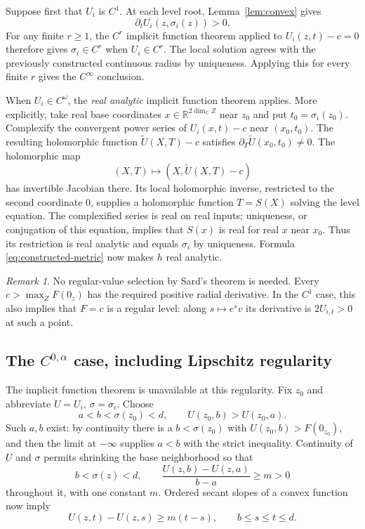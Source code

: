 \documentclass[11pt]{amsart}
\theoremstyle{definition}
\theoremstyle{remark}
\newtheorem{remark}[theorem]{Remark}
\numberwithin{equation}{section}
\newcommand{\C}{\mathbb C}
\newcommand{\R}{\mathbb R}
\begin{document}
Suppose first that $U_i$ is $C^1$. At each level root,
Lemma~\ref{lem:convex} gives
\begin{equation}\label{eq:transversality}
\partial_tU_i(z,\sigma_i(z))>0.
\end{equation}
For any finite $r\ge1$, the $C^r$ implicit function theorem applied
to $U_i(z,t)-c=0$ therefore gives $\sigma_i\in C^r$ when $U_i\in C^r$.
The local solution agrees with the previously constructed continuous
radius by uniqueness. Applying this for every finite $r$ gives the
$C^\infty$ conclusion.

When $U_i\in C^\omega$, the \emph{real analytic} implicit function
theorem applies. More explicitly, take real base coordinates
$x\in\R^{2\dim_\C Z}$ near $z_0$ and put $t_0=\sigma_i(z_0)$.
Complexify the convergent power series of $U_i(x,t)-c$ near
$(x_0,t_0)$. The resulting holomorphic function
$\widetilde U(X,T)-c$ satisfies
$\partial_T\widetilde U(x_0,t_0)\ne0$. The holomorphic map
\[
(X,T)\longmapsto (X,\widetilde U(X,T)-c)
\]
has invertible Jacobian there. Its local holomorphic inverse, restricted
to the second coordinate $0$, supplies a holomorphic function
$T=S(X)$ solving the level equation. The complexified series is real
on real inputs; uniqueness, or conjugation of this equation, implies
that $S(x)$ is real for real $x$ near $x_0$. Thus its restriction is
real analytic and equals $\sigma_i$ by uniqueness. Formula
\eqref{eq:constructed-metric} now makes $h$ real analytic.

\begin{remark}
No regular-value selection by Sard's theorem is needed. Every
$c>\max_ZF(0_z)$ has the required positive radial derivative. In the
$C^1$ case, this also implies that $F=c$ is a regular level: along
$s\mapsto e^s v$ its derivative is $2U_{i,t}>0$ at such a point.
\end{remark}

\subsection{The \texorpdfstring{$C^{0,\alpha}$}{C-(0,alpha)} case, including Lipschitz regularity}

The implicit function theorem is unavailable at this regularity.
Fix $z_0$ and abbreviate $U=U_i$, $\sigma=\sigma_i$. Choose
\[
a<b<\sigma(z_0)<d,\qquad U(z_0,b)>U(z_0,a).
\]
Such $a,b$ exist: by continuity there is a $b<\sigma(z_0)$ with
$U(z_0,b)>F(0_{z_0})$, and then the limit at $-\infty$ supplies $a<b$
with the strict inequality. Continuity of $U$ and $\sigma$ permits
shrinking the base neighborhood so that
\begin{equation}\label{eq:secant}
b<\sigma(z)<d,\qquad
\frac{U(z,b)-U(z,a)}{b-a}\ge m>0
\end{equation}
throughout it, with one constant $m$. Ordered secant slopes of a
convex function now imply
\begin{equation}\label{eq:strong-increase}
U(z,t)-U(z,s)\ge m(t-s),\qquad b\le s\le t\le d.
\end{equation}
\end{document}
